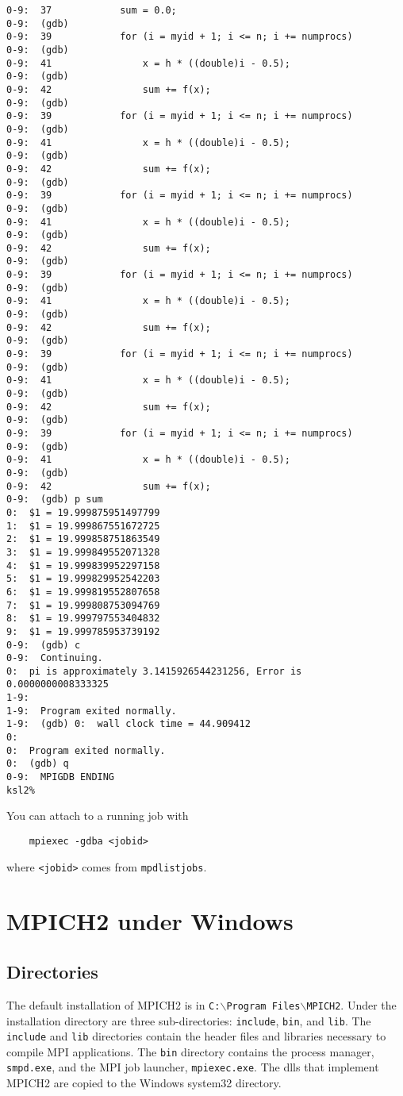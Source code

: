 \documentclass[dvipdfm,11pt]{article}
\begin{document}
\begin{tiny}
\begin{verbatim}
0-9:  37            sum = 0.0;
0-9:  (gdb) 
0-9:  39            for (i = myid + 1; i <= n; i += numprocs)
0-9:  (gdb) 
0-9:  41                x = h * ((double)i - 0.5);
0-9:  (gdb) 
0-9:  42                sum += f(x);
0-9:  (gdb) 
0-9:  39            for (i = myid + 1; i <= n; i += numprocs)
0-9:  (gdb) 
0-9:  41                x = h * ((double)i - 0.5);
0-9:  (gdb) 
0-9:  42                sum += f(x);
0-9:  (gdb) 
0-9:  39            for (i = myid + 1; i <= n; i += numprocs)
0-9:  (gdb) 
0-9:  41                x = h * ((double)i - 0.5);
0-9:  (gdb) 
0-9:  42                sum += f(x);
0-9:  (gdb) 
0-9:  39            for (i = myid + 1; i <= n; i += numprocs)
0-9:  (gdb) 
0-9:  41                x = h * ((double)i - 0.5);
0-9:  (gdb) 
0-9:  42                sum += f(x);
0-9:  (gdb) 
0-9:  39            for (i = myid + 1; i <= n; i += numprocs)
0-9:  (gdb) 
0-9:  41                x = h * ((double)i - 0.5);
0-9:  (gdb) 
0-9:  42                sum += f(x);
0-9:  (gdb) 
0-9:  39            for (i = myid + 1; i <= n; i += numprocs)
0-9:  (gdb) 
0-9:  41                x = h * ((double)i - 0.5);
0-9:  (gdb) 
0-9:  42                sum += f(x);
0-9:  (gdb) p sum
0:  $1 = 19.999875951497799
1:  $1 = 19.999867551672725
2:  $1 = 19.999858751863549
3:  $1 = 19.999849552071328
4:  $1 = 19.999839952297158
5:  $1 = 19.999829952542203
6:  $1 = 19.999819552807658
7:  $1 = 19.999808753094769
8:  $1 = 19.999797553404832
9:  $1 = 19.999785953739192
0-9:  (gdb) c
0-9:  Continuing.
0:  pi is approximately 3.1415926544231256, Error is 0.0000000008333325
1-9:  
1-9:  Program exited normally.
1-9:  (gdb) 0:  wall clock time = 44.909412
0:  
0:  Program exited normally.
0:  (gdb) q
0-9:  MPIGDB ENDING
ksl2% 
\end{verbatim}
\end{tiny}
You can attach to a running job with
\begin{verbatim}
    mpiexec -gdba <jobid>
\end{verbatim}
where \texttt{<jobid>} comes from \texttt{mpdlistjobs}.

\section{MPICH2 under Windows}
\label{sec:windows}

\subsection{Directories}
\label{sec:windir}

The default installation of MPICH2 is in
\texttt{C:$\backslash$Program Files$\backslash$MPICH2}. Under the installation
directory are three sub-directories: \texttt{include}, \texttt{bin}, and
\texttt{lib}.  The \texttt{include} and \texttt{lib} directories contain
the header files and libraries necessary to compile MPI applications.  
The \texttt{bin} directory contains the process manager, \texttt{smpd.exe},
and the MPI job launcher, \texttt{mpiexec.exe}.  The dlls that implement
MPICH2 are copied to the Windows system32 directory.
\end{document}
